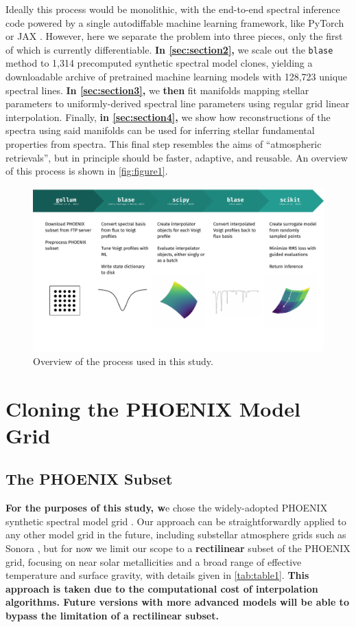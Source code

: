\documentclass[twocolumn, linenumbers]{aastex631}
\begin{document}
Ideally this process would be monolithic, with the end-to-end spectral inference code powered by a single autodiffable machine learning framework, like PyTorch \textbf{\citep{pytorch}} or JAX \citep{jax}.
However, here we separate the problem into three pieces, only the first of which is currently differentiable.
\textbf{In \autoref{sec:section2},} we scale out the \texttt{blase} method to 1,314 precomputed synthetic spectral model clones, yielding a downloadable archive of pretrained machine learning models with 128,723 unique spectral lines.
\textbf{In \autoref{sec:section3},} we \textbf{then} fit manifolds mapping stellar parameters to uniformly-derived spectral line parameters using regular grid linear interpolation.
Finally, \textbf{in \autoref{sec:section4},} we show how reconstructions of the spectra using said manifolds can be used for inferring stellar fundamental properties from spectra.
This final step resembles the aims of ``atmospheric retrievals'', but in principle should be faster, adaptive, and reusable.
An overview of this process is shown in \autoref{fig:figure1}.

\begin{figure}
    \centering
    \includegraphics[width=\textwidth]{figure1}
    \caption{Overview of the process used in this study.}
    \label{fig:figure1}
\end{figure}


\section{Cloning the PHOENIX Model Grid}
\label{sec:section2}
\subsection{The PHOENIX Subset}
\textbf{For the purposes of this study, w}e chose the widely-adopted PHOENIX synthetic spectral model grid \citep{PHOENIX}.
Our approach can be straightforwardly applied to any other model grid in the future, including substellar atmosphere grids such as Sonora \citep{bobcat, cholla, diamondback, elfowl}, but for now we limit our scope to a \textbf{rectilinear} subset of the PHOENIX grid, focusing on near solar metallicities and a broad range of effective temperature and surface gravity, with details given in \autoref{tab:table1}.
\textbf{This approach is taken due to the computational cost of interpolation algorithms.
Future versions with more advanced models will be able to bypass the limitation of a rectilinear subset.}
\end{document}
